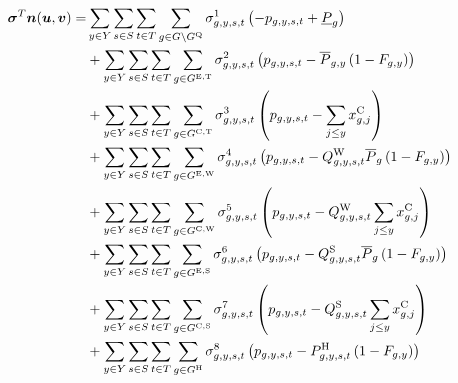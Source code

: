 \documentclass{article}
\begin{document}
\begin{align}
	\bm{\sigma}^{T}\bm{n}(\bm{u}, \bm{v}) = & \sum\limits_{\iYear \in \sYears}\sum\limits_{\iScenario \in \sScenarios}\sum\limits_{\iInterval \in \sIntervals} \sum\limits_{\iGenerator \in \sGenerators \setminus \sStorage} \dMinPowerOutput \left(-\vPower + \cPowerOutputMin\right) \nonumber\\
	& + \sum\limits_{\iYear \in \sYears}\sum\limits_{\iScenario \in \sScenarios}\sum\limits_{\iInterval \in \sIntervals} \sum\limits_{\iGenerator \in \sGeneratorsExistingThermal} \dMaxPowerOutputExistingThermal \left(\vPower - \cPowerOutputMax \left(1 - \cRetirementIndicator\right)\right) \nonumber\\
	& + \sum\limits_{\iYear \in \sYears}\sum\limits_{\iScenario \in \sScenarios}\sum\limits_{\iInterval \in \sIntervals} \sum\limits_{\iGenerator \in \sGeneratorsCandidateThermal} \dMaxPowerOutputCandidateThermal \left(\vPower - \sum\limits_{\iYearAlias \leq \iYear} \vInstalledCapacity[\iGenerator,\iYearAlias]\right) \nonumber\\
	& + \sum\limits_{\iYear \in \sYears}\sum\limits_{\iScenario \in \sScenarios}\sum\limits_{\iInterval \in \sIntervals} \sum\limits_{\iGenerator \in \sGeneratorsExistingWind} \dMaxPowerOutputWindExisting \left(\vPower - \cCapacityFactorWind \cPowerOutputMax[\iGenerator] \left(1 - \cRetirementIndicator\right) \right) \nonumber\\
	& + \sum\limits_{\iYear \in \sYears}\sum\limits_{\iScenario \in \sScenarios}\sum\limits_{\iInterval \in \sIntervals} \sum\limits_{\iGenerator \in \sGeneratorsCandidateWind} \dMaxPowerOutputWindCandidate \left(\vPower - \cCapacityFactorWind \sum\limits_{\iYearAlias \leq \iYear} \vInstalledCapacity[\iGenerator,\iYearAlias]\right) \nonumber\\
	& + \sum\limits_{\iYear \in \sYears}\sum\limits_{\iScenario \in \sScenarios}\sum\limits_{\iInterval \in \sIntervals} \sum\limits_{\iGenerator \in \sGeneratorsExistingSolar} \dMaxPowerOutputSolarExisting \left(\vPower - \cCapacityFactorSolar \cPowerOutputMax[\iGenerator] \left(1 - \cRetirementIndicator\right)\right) \nonumber\\
	& + \sum\limits_{\iYear \in \sYears}\sum\limits_{\iScenario \in \sScenarios}\sum\limits_{\iInterval \in \sIntervals} \sum\limits_{\iGenerator \in \sGeneratorsCandidateSolar} \dMaxPowerOutputSolarCandidate \left(\vPower - \cCapacityFactorSolar \sum\limits_{\iYearAlias \leq \iYear} \vInstalledCapacity[\iGenerator,\iYearAlias]\right) \nonumber\\
	& + \sum\limits_{\iYear \in \sYears}\sum\limits_{\iScenario \in \sScenarios}\sum\limits_{\iInterval \in \sIntervals} \sum\limits_{\iGenerator \in \sGeneratorsHydro} \dMaxPowerOutputHydro \left(\vPower - \cPowerOutputHydro \left(1 - \cRetirementIndicator\right) \right) \nonumber\\

\end{align}
\end{document}
